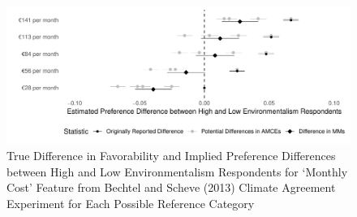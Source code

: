 \documentclass[a4paper,12pt]{article}\usepackage[]{graphicx}\usepackage[]{color}
\makeatletter
\def\maxwidth{ %
  \ifdim\Gin@nat@width>\linewidth
    \linewidth
  \else
    \Gin@nat@width
  \fi
}
\newenvironment{knitrout}{}{} %
\makeatother
\begin{document}
\begin{knitrout}
\color{fgcolor}\begin{figure}
\includegraphics[width=\maxwidth]{figure/bechtel_difference_comparison-1} \caption[True Difference in Favorability and Implied Preference Differences between High and Low Environmentalism Respondents for `Monthly Cost' Feature from Bechtel and Scheve (2013) Climate Agreement Experiment for Each Possible Reference Category]{True Difference in Favorability and Implied Preference Differences between High and Low Environmentalism Respondents for `Monthly Cost' Feature from Bechtel and Scheve (2013) Climate Agreement Experiment for Each Possible Reference Category}\label{fig:bechtel_difference_comparison}
\end{figure}


\end{knitrout}
\end{document}
